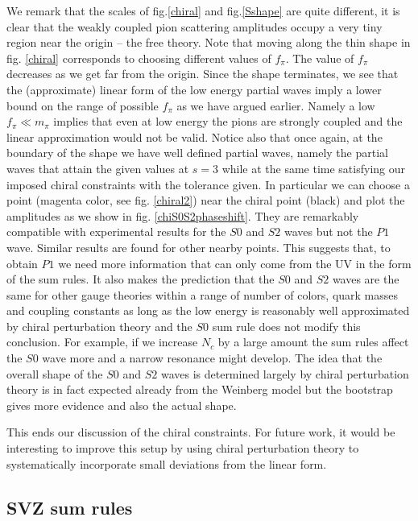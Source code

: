 \documentclass[12pt,letterpaper]{article}
\begin{document}
 We remark that the scales of fig.\ref{chiral} and fig.\ref{Sshape} are quite different, it is clear that the weakly coupled pion scattering amplitudes occupy a very tiny region near the origin -- the free theory. Note that moving along the thin shape in fig. \ref{chiral} corresponds to choosing different values of $f_{\pi}$. The value of $f_\pi$ decreases as we get far from the origin. Since the shape terminates, we see that the (approximate) linear form of the low energy partial waves imply a lower bound on the range of possible $f_{\pi}$ as we have argued earlier. Namely a low $f_\pi\ll m_\pi$ implies that even at low energy the pions are strongly coupled and the linear approximation would not be valid. Notice also that once again, at the boundary of the shape we have well defined partial waves, namely the partial waves that attain the given values at $s=3$ while at the same time satisfying our imposed chiral constraints with the tolerance given. In particular we can choose a point (magenta color, see fig. \ref{chiral2}) near the chiral point (black) and plot the amplitudes as we show in fig. \ref{chiS0S2phaseshift}. They are remarkably compatible with experimental results for the $S0$ and $S2$ waves but not the $P1$ wave. Similar results are found for other nearby points. This suggests that, to obtain $P1$ we need more information that can only come from the UV in the form of the sum rules. It also makes the prediction that the $S0$ and $S2$ waves are the same for other gauge theories within a range of number of colors, quark masses and coupling constants as long as the low energy is reasonably well approximated by chiral perturbation theory and the $S0$ sum rule does not modify this conclusion. For example, if we increase $N_c$ by a large amount the sum rules affect the $S0$ wave more and a narrow resonance might develop. The idea that the overall shape of the $S0$ and $S2$ waves is determined largely by chiral perturbation theory is in fact expected already from the Weinberg model but the bootstrap gives more evidence and also the actual shape.  
 
This ends our discussion of the chiral constraints. For future work, it would be interesting to improve this setup by using chiral perturbation theory to systematically incorporate small deviations from the linear form.  
\bigskip
\subsection{SVZ sum rules}
\end{document}
